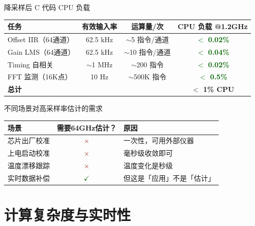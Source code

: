 \documentclass[table,UTF8,11pt,aspectratio=169]{beamer}
\begin{document}
\begin{frame}{降采样后 C 代码 CPU 负载}
\begin{table}
\begin{tabular}{lccc}
\toprule
\textbf{任务} & \textbf{有效输入率} & \textbf{运算量/次} & \textbf{CPU 负载 @1.2GHz} \\
\midrule
Offset IIR（64通道） & 62.5 kHz & $\sim$5 指令/通道 & \textcolor{darkgreen}{\textbf{$<$ 0.02\%}} \\
Gain LMS（64通道） & 62.5 kHz & $\sim$10 指令/通道 & \textcolor{darkgreen}{\textbf{$<$ 0.04\%}} \\
Timing 自相关 & $\sim$1 MHz & $\sim$200 指令 & \textcolor{darkgreen}{\textbf{$<$ 0.02\%}} \\
FFT 监测（16K点） & 10 Hz & $\sim$500K 指令 & \textcolor{darkgreen}{\textbf{$<$ 0.5\%}} \\
\midrule
\textbf{总计} & & & \textbf{$<$ 1\% CPU} \\
\bottomrule
\end{tabular}
\end{table}

\vspace{0.2cm}
\begin{block}{不同场景对高采样率估计的需求}
\small
\begin{tabular}{lcl}
\toprule
\textbf{场景} & \textbf{需要64GHz估计？} & \textbf{原因} \\
\midrule
芯片出厂校准 & \textcolor{darkred}{$\times$} & 一次性，可用外部仪器 \\
上电启动校准 & \textcolor{darkred}{$\times$} & 毫秒级收敛即可 \\
温度漂移跟踪 & \textcolor{darkred}{$\times$} & 温度变化是秒级 \\
实时数据补偿 & \textcolor{darkgreen}{$\checkmark$} & 但这是「应用」不是「估计」 \\
\bottomrule
\end{tabular}
\end{block}
\end{frame}

\section{计算复杂度与实时性}
\end{document}
